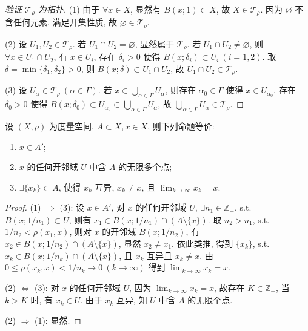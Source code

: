 \begin{proof}[验证 $\mathcal{T}_\rho$ 为拓扑]
(1) 由于 $\forall x \in X$, 显然有 $B(x; 1) \subset X$, 故 $X \in \mathcal{T}_\rho$. 因为 $\varnothing$ 不含任何元素, 满足开集性质, 故 $\varnothing \in \mathcal{T}_\rho$.

(2) 设 $U_1, U_2 \in \mathcal{T}_\rho$. 若 $U_1 \cap U_2 = \varnothing$, 显然属于 $\mathcal{T}_\rho$. 若 $U_1 \cap U_2 \neq \varnothing$, 则 $\forall x \in U_1 \cap U_2$, 有 $x \in U_i$, 存在 $\delta_i > 0$ 使得 $B(x; \delta_i) \subset U_i\ (i = 1, 2)$. 取 $\delta = \min\{\delta_1, \delta_2\} > 0$, 则 $B(x; \delta) \subset U_1 \cap U_2$, 故 $U_1 \cap U_2 \in \mathcal{T}_\rho$.

(3) 设 $U_\alpha \in \mathcal{T}_\rho\ (\alpha \in \Gamma)$. 若 $x \in \bigcup_{\alpha \in \Gamma} U_\alpha$, 则存在 $\alpha_0 \in \Gamma$ 使得 $x \in U_{\alpha_0}$. 存在 $\delta_0 > 0$ 使得 $B(x; \delta_0) \subset U_{\alpha_0} \subset \bigcup_{\alpha \in \Gamma} U_\alpha$, 故 $\bigcup_{\alpha \in \Gamma} U_\alpha \in \mathcal{T}_\rho$. \qedhere
\end{proof}

\begin{theorem}\label{thm:7.1.6}
设 $(X, \rho)$ 为度量空间, $A \subset X, x \in X$, 则下列命题等价:
\begin{enumerate}
  \item $x \in A'$;
  \item $x$ 的任何开邻域 $U$ 中含 $A$ 的无限多个点;
  \item $\exists \{x_k\} \subset A$, 使得 $x_k$ 互异, $x_k \neq x$, 且 $\lim_{k \to \infty} x_k = x$.
\end{enumerate}
\end{theorem}

\begin{proof}
(1) $\Rightarrow$ (3): 设 $x \in A'$, 对 $x$ 的任何开邻域 $U$, $\exists n_1 \in \mathbb{Z}_+$, s.t. $B(x; 1/n_1) \subset U$, 则有 $x_1 \in B(x; 1/n_1) \cap (A \setminus \{x\})$. 取 $n_2 > n_1$, s.t. $1/n_2 < \rho(x_1, x)$, 则对 $x$ 的开邻域 $B(x; 1/n_2)$, 有 $x_2 \in B(x; 1/n_2) \cap (A \setminus \{x\})$, 显然 $x_2 \neq x_1$. 依此类推, 得到 $\{x_k\}$, s.t. $x_k \in B(x; 1/n_k) \cap (A \setminus \{x\})$, 且 $x_k$ 互异且 $x_k \neq x$. 由 $0 \leqslant \rho(x_k, x) < 1/n_k \to 0\ (k \to \infty)$ 得到 $\lim_{k \to \infty} x_k = x$.

(2) $\Leftrightarrow$ (3): 对 $x$ 的任何开邻域 $U$, 因为 $\lim_{k \to \infty} x_k = x$, 故存在 $K \in \mathbb{Z}_+$, 当 $k > K$ 时, 有 $x_k \in U$. 由于 $x_k$ 互异, 知 $U$ 中含 $A$ 的无限个点.

(2) $\Rightarrow$ (1): 显然. \qedhere
\end{proof}

